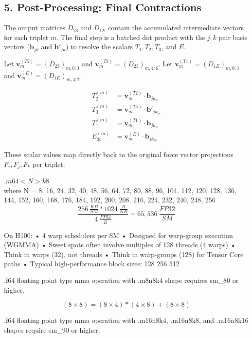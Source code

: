 \documentclass[12pt]{article}
\begin{document}
\subsection*{5. Post-Processing: Final Contractions}
The output matrices $D_{23}$ and $D_{1E}$ contain the accumulated intermediate vectors for each triplet $m$. The final step is a batched dot product with the $j,k$ pair basis vectors ($\mathbf{b}_{jk}$ and $\mathbf{b}'_{jk}$) to resolve the scalars $T_1, T_2, T_3$, and $E$. 

Let $\mathbf{v}^{(T2)}_m = (D_{23})_{m, 0:3}$ and $\mathbf{v}^{(T3)}_m = (D_{23})_{m, 4:6}$.
Let $\mathbf{v}^{(T1)}_m = (D_{1E})_{m, 0:3}$ and $\mathbf{v}^{(E)}_m = (D_{1E})_{m, 4:7}$.

\begin{align}
T_2^{(m)} &= \mathbf{v}^{(T2)}_m \cdot \mathbf{b}_{jk_m} \\
T_3^{(m)} &= \mathbf{v}^{(T3)}_m \cdot \mathbf{b}'_{jk_m} \\
T_1^{(m)} &= \mathbf{v}^{(T1)}_m \cdot \mathbf{b}_{jk_m} \\
E_{3b}^{(m)} &= \mathbf{v}^{(E)}_m \cdot \mathbf{b}_{jk_m}
\end{align}

These scalar values map directly back to the original force vector projections $F_i, F_j, F_k$ per triplet.




\clearpage

$.m64<N>k8$\\
where N = 8, 16, 24, 32, 40, 48, 56, 64, 72, 80, 88, 96, 104, 112, 120, 128, 136, 144, 152, 160, 168, 176, 184, 192, 200, 208, 216, 224, 232, 240, 248, 256\\

$$\frac{256 ~\frac{KB}{SM} * 1024 ~\frac{B}{KB}}{4 ~\frac{FP32}{B}} = 65,536 ~\frac{FP32}{SM}$$


On H100:
	•	4 warp schedulers per SM
	•	Designed for warp-group execution (WGMMA)
	•	Sweet spots often involve multiples of 128 threads (4 warps)
	•	Think in warps (32), not threads
	•	Think in warp-groups (128) for Tensor Core paths
	•	Typical high-performance block sizes: 128 256 512


.f64 floating point type mma operation with .m8n8k4 shape requires sm\_80 or higher. 

$$(8\times8)=(8\times4)*(4\times8) + (8\times8)$$


.f64 floating point type mma operation with .m16n8k4, .m16n8k8, and .m16n8k16 shapes require sm\_90 or higher.
\end{document}
